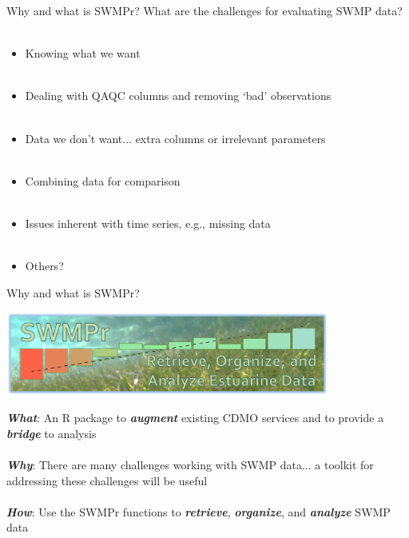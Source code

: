 \documentclass[xcolor=dvipsnames]{beamer}\usepackage[]{graphicx}\usepackage[]{color}
\newcommand{\Bigtxt}[1]{\textbf{\textit{#1}}}
\begin{document}
\begin{frame}[t]{Why and what is SWMPr?}
\onslide<+->
What are the challenges for evaluating SWMP data? \\~\\
\onslide<+->
\begin{itemize}
\item Knowing what we want \\~\\
\item Dealing with QAQC columns and removing `bad' observations \\~\\
\item Data we don't want... extra columns or irrelevant parameters \\~\\
\item Combining data for comparison\\~\\
\item Issues inherent with time series, e.g., missing data \\~\\
\item Others?
\end{itemize}
\end{frame}

\begin{frame}{Why and what is SWMPr?}
\onslide<+->
\centerline{\includegraphics[width = 0.8\textwidth]{imgs/swmpr_logo.png}}
\vspace{0.2in}
\textbf{\emph{What}}: An R package to \Bigtxt{augment} existing CDMO services and to provide a \Bigtxt{bridge} to analysis\\~\\
\onslide<+->
\Bigtxt{Why}: There are many challenges working with SWMP data... a toolkit for addressing these challenges will be useful \\~\\
\onslide<+->
\Bigtxt{How}: Use the SWMPr functions to \Bigtxt{retrieve}, \Bigtxt{organize}, and \Bigtxt{analyze} SWMP data 
\end{frame}
\end{document}
